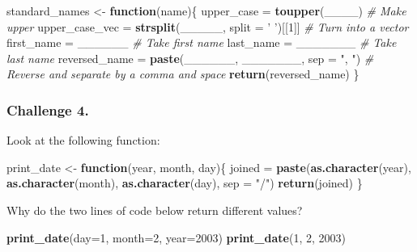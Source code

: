\documentclass[
]{book}
\newenvironment{Shaded}{\begin{snugshade}}{\end{snugshade}}
\newcommand{\CommentTok}[1]{\textcolor[rgb]{0.56,0.35,0.01}{\textit{#1}}}
\newcommand{\ControlFlowTok}[1]{\textcolor[rgb]{0.13,0.29,0.53}{\textbf{#1}}}
\newcommand{\DataTypeTok}[1]{\textcolor[rgb]{0.13,0.29,0.53}{#1}}
\newcommand{\DecValTok}[1]{\textcolor[rgb]{0.00,0.00,0.81}{#1}}
\newcommand{\KeywordTok}[1]{\textcolor[rgb]{0.13,0.29,0.53}{\textbf{#1}}}
\newcommand{\NormalTok}[1]{#1}
\newcommand{\StringTok}[1]{\textcolor[rgb]{0.31,0.60,0.02}{#1}}
\begin{document}
\begin{Shaded}
\begin{Highlighting}[]
\NormalTok{standard_names <-}\StringTok{ }\ControlFlowTok{function}\NormalTok{(name)\{}
\NormalTok{    upper_case =}\StringTok{ }\KeywordTok{toupper}\NormalTok{(____) }\CommentTok{# Make upper}
\NormalTok{    upper_case_vec =}\StringTok{ }\KeywordTok{strsplit}\NormalTok{(_____, }\DataTypeTok{split =} \StringTok{' '}\NormalTok{)[[}\DecValTok{1}\NormalTok{]] }\CommentTok{# Turn into a vector}
\NormalTok{    first_name =}\StringTok{ }\NormalTok{______ }\CommentTok{# Take first name}
\NormalTok{    last_name =}\StringTok{ }\NormalTok{_______ }\CommentTok{# Take last name}
\NormalTok{    reversed_name =}\StringTok{ }\KeywordTok{paste}\NormalTok{(______, _______, }\DataTypeTok{sep =} \StringTok{", "}\NormalTok{) }\CommentTok{# Reverse and separate by a comma and space}
    \KeywordTok{return}\NormalTok{(reversed_name)}
\NormalTok{\}}
\end{Highlighting}
\end{Shaded}

\hypertarget{challenge-4.-4}{%
\subsubsection*{Challenge 4.}\label{challenge-4.-4}}

Look at the following function:

\begin{Shaded}
\begin{Highlighting}[]
\NormalTok{print_date <-}\StringTok{ }\ControlFlowTok{function}\NormalTok{(year, month, day)\{}
\NormalTok{    joined =}\StringTok{ }\KeywordTok{paste}\NormalTok{(}\KeywordTok{as.character}\NormalTok{(year), }\KeywordTok{as.character}\NormalTok{(month), }\KeywordTok{as.character}\NormalTok{(day), }\DataTypeTok{sep =} \StringTok{"/"}\NormalTok{)}
    \KeywordTok{return}\NormalTok{(joined)}
\NormalTok{\}}
\end{Highlighting}
\end{Shaded}

Why do the two lines of code below return different values?

\begin{Shaded}
\begin{Highlighting}[]
\KeywordTok{print_date}\NormalTok{(}\DataTypeTok{day=}\DecValTok{1}\NormalTok{, }\DataTypeTok{month=}\DecValTok{2}\NormalTok{, }\DataTypeTok{year=}\DecValTok{2003}\NormalTok{)}
\KeywordTok{print_date}\NormalTok{(}\DecValTok{1}\NormalTok{, }\DecValTok{2}\NormalTok{, }\DecValTok{2003}\NormalTok{)}
\end{Highlighting}
\end{Shaded}
\end{document}

